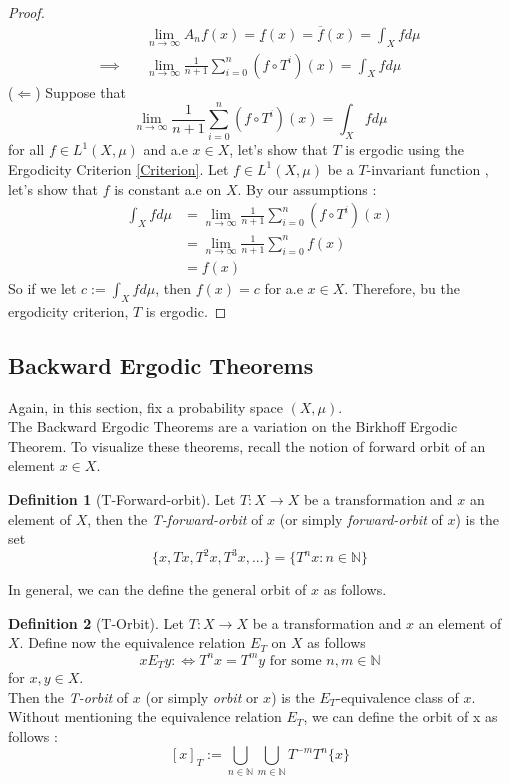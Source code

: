 \documentclass{article}
\theoremstyle{definition}
\newtheorem{definition}{Definition}[section]
\begin{document}
\begin{proof}
\begin{align*}
        & \lim_{n\to\infty}A_nf(x) = \underline{f}(x) =\overline{f}(x) = \int_Xfd\mu \\
        \implies \quad & \lim_{n\to\infty}\frac{1}{n+1} \sum_{i=0}^n (f\circ T^i)(x)=\int_Xfd\mu
    \end{align*}
    ($\Leftarrow$) Suppose that $$\lim_{n\to\infty}\frac{1}{n+1} \sum_{i=0}^n(f\circ T^i)(x)=\int_Xfd\mu$$ for all $f\in L^1(X,\mu)$ and a.e $x\in X$, let's show that $T$ is ergodic using the Ergodicity Criterion \ref{Criterion}. Let $f\in L^1(X,\mu)$ be a $T$-invariant function , let's show that $f$ is constant a.e on $X$. By our assumptions :
    \begin{align*}
        \int_Xfd\mu &= \lim_{n\to\infty}\frac{1}{n+1} \sum_{i=0}^n(f\circ T^i)(x) \\
        &= \lim_{n\to\infty}\frac{1}{n+1} \sum_{i=0}^nf(x) \\
        &= f(x)
    \end{align*}
    So if we let $c := \int_Xfd\mu$, then $f(x)=c$ for a.e $x\in X$. Therefore, bu the ergodicity criterion, $T$ is ergodic.
\end{proof}

\subsection{Backward Ergodic Theorems}
Again, in this section, fix a probability space $(X,\mu)$.\\
The Backward Ergodic Theorems are a variation on the Birkhoff Ergodic Theorem. To visualize these theorems, recall the notion of forward orbit of an element $x\in X$.

\begin{definition}[T-Forward-orbit]
    Let $T:X\to X$ be a transformation and $x$ an element of $X$, then the \textit{T-forward-orbit} of $x$ (or simply \textit{forward-orbit} of $x$) is the set 
    $$\{ x, Tx, T^2x, T^3x, ...\} = \{T^nx : n\in\mathbb{N}\}$$
\end{definition}

In general, we can the define the general orbit of $x$ as follows.

\begin{definition}[T-Orbit]
    Let $T:X\to X$ be a transformation and $x$ an element of $X$. Define now the equivalence relation $E_T$ on $X$ as follows
    $$xE_Ty :\iff T^nx=T^my \text{ for some } n,m\in\mathbb{N}$$
    for $x,y\in X$.\\
    Then the \textit{T-orbit} of $x$ (or simply \textit{orbit} or $x$) is the $E_T$-equivalence class of $x$. Without mentioning the equivalence relation $E_T$, we can define the orbit of x as follows :
    $$[x]_T := \bigcup_{n\in\mathbb{N}} \bigcup_{m\in\mathbb{N}} T^{-m}T^n\{x\}$$
\end{definition}
\end{document}
